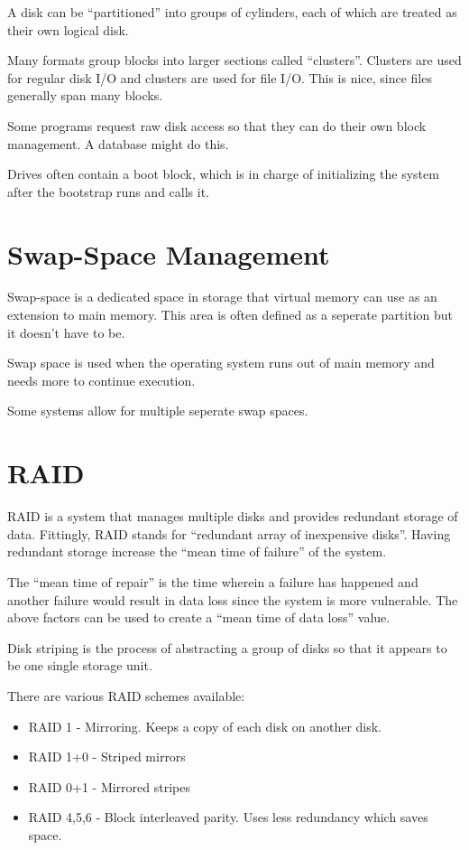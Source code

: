 \documentclass{article}
\begin{document}
A disk can be ``partitioned'' into groups of cylinders, each of which are
treated as their own logical disk.

Many formats group blocks into larger sections called ``clusters''. Clusters
are used for regular disk I/O and clusters are used for file I/O. This is
nice, since files generally span many blocks.

Some programs request raw disk access so that they can do their own block
management. A database might do this.

Drives often contain a boot block, which is in charge of initializing the
system after the bootstrap runs and calls it.

\section{Swap-Space Management}
Swap-space is a dedicated space in storage that virtual memory can use as an
extension to main memory. This area is often defined as a seperate partition
but it doesn't have to be.

Swap space is used when the operating system runs out of main memory and needs
more to continue execution.

Some systems allow for multiple seperate swap spaces.

\section{RAID}
RAID is a system that manages multiple disks and provides redundant storage of
data. Fittingly, RAID stands for ``redundant array of inexpensive disks''.
Having redundant storage increase the ``mean time of failure'' of the system.

The ``mean time of repair'' is the time wherein a failure has happened and
another failure would result in data loss since the system is more vulnerable.
The above factors can be used to create a ``mean time of data loss'' value.

Disk striping is the process of abstracting a group of disks so that it appears
to be one single storage unit.

There are various RAID schemes available:

\begin{itemize}
	\item RAID 1 - Mirroring. Keeps a copy of each disk on another disk.
	\item RAID 1+0 - Striped mirrors
	\item RAID 0+1 - Mirrored stripes
	\item RAID 4,5,6 - Block interleaved parity. Uses less redundancy which
	      saves space.
\end{itemize}
\end{document}
